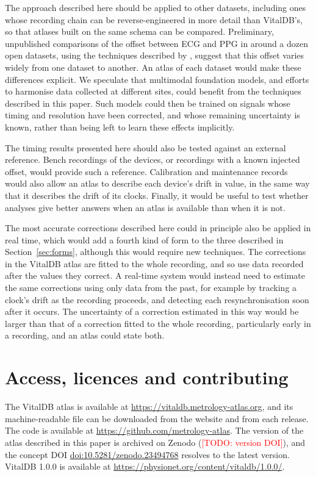 \documentclass[11pt,a4paper]{article}
\newcommand{\atlasurl}{\url{https://vitaldb.metrology-atlas.org}}
\newcommand{\todo}[1]{\textcolor{red}{[TODO: #1]}}
\begin{document}
The approach described here should be applied to other datasets, including ones whose recording chain can be
reverse-engineered in more detail than VitalDB's, so that atlases built on the same schema can be compared.
Preliminary, unpublished comparisons of the offset between ECG and PPG in around a dozen open datasets, using the
techniques described by \citet{ruffolo2025high}, suggest that this offset varies widely from one dataset to another.
An atlas of each dataset would make these differences explicit. We speculate that multimodal foundation models, and
efforts to harmonise data collected at different sites, could benefit from the techniques described in this paper.
Such models could then be trained on signals whose timing and resolution have been corrected, and whose remaining
uncertainty is known, rather than being left to learn these effects implicitly.

The timing results presented here should also be tested against an external reference. Bench recordings of the
devices, or recordings with a known injected offset, would provide such a reference. Calibration and maintenance
records would also allow an atlas to describe each device's drift in value, in the same way that it describes the
drift of its clocks. Finally, it would be useful to test whether analyses give better answers when an atlas is available
than when it is not.

The most accurate corrections described here could in principle also be applied in real time, which would add a fourth
kind of form to the three described in Section~\ref{sec:forms}, although this would require new techniques. The
corrections in the VitalDB atlas are fitted to the whole recording, and so use data recorded after the values they
correct. A real-time system would instead need to estimate the same corrections using only data from the past, for
example by tracking a clock's drift as the recording proceeds, and detecting each resynchronisation soon after it
occurs. The uncertainty of a correction estimated in this way would be larger than that of a correction fitted to the
whole recording, particularly early in a recording, and an atlas could state both.

\section{Access, licences and contributing}
\label{sec:access}

The VitalDB atlas is available at \atlasurl, and its machine-readable file can be downloaded from the website and from
each release. The code is available at \url{https://github.com/metrology-atlas}. The version of the atlas described in
this paper is archived on Zenodo (\todo{version DOI}), and the concept DOI
\href{https://doi.org/10.5281/zenodo.23494768}{doi:10.5281/zenodo.23494768} resolves to the latest version. VitalDB
1.0.0 is available at \url{https://physionet.org/content/vitaldb/1.0.0/}.
\end{document}
